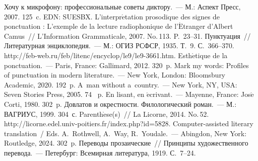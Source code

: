   





 \begin{multicols}{2}

\renewcommand{\bibname}{\protect\rmfamily Литература}

{\small\frenchspacing
{\baselineskip=10.5pt
\begin{thebibliography}{99}
 Хочу к микрофону: профессиональные советы диктору.~--- 
М.: Аспект Пресс, 2007. 125~c. EDN: SUESBX.
 L'interpr$\acute{\mbox{e}}$tation prosodique des signes de 
ponctuation : L'exemple de la lecture radiophonique de 
l'$\acute{\mbox{E}}$tranger d'Albert Camus~// L'Information Grammaticale, 
2007. No.\,113. P.~23--31.
 Пунктуация~// Литературная энциклопедия.~--- М.: 
ОГИЗ РСФСР, 1935. Т.~9. С.~366--370. 
{\sf http://feb-web.ru/feb/litenc/encyclop/le9/le9-3661.htm}.
 Esth$\acute{\mbox{e}}$tique de la 
ponctuation.~--- Paris, France: Gallimard, 2012. 320~p.
 Mark my words: Profiles of punctuation in modern 
literature.~--- New York, London: Bloomsbury Academic, 2020. 
192~p.
 A~man without a~country.~--- New York, NY, USA: Seven 
Stories Press, 2005. 74~ p.
 En lisant, en $\acute{\mbox{e}}$crivant.~--- Mayenne, France: 
Jos$\acute{\mbox{e}}$ Corti, 1980. 302~p.
 Довлатов и окрестности. Филологический роман.~--- М.: 
ВАГРИУС, 1999. 304~с.
 Parenth$\grave{\mbox{e}}$se(s)~// La Licorne, 2014. 
No.\,52. {\sf http://licorne.edel.univ-poitiers.fr/index.php?id=5828}.
Computer-assisted literary translation~/ Eds. A.~Rothwell, A.~Way, 
R.~Youdale.~--- Abingdon, New York: Routledge, 2024. 
302~p.
 Переводы прозаические~// Принципы художественного 
перевода.~--- Петербург: Всемирная литература, 1919. С.~7--24.

\end{thebibliography}}}
\end{multicols}
